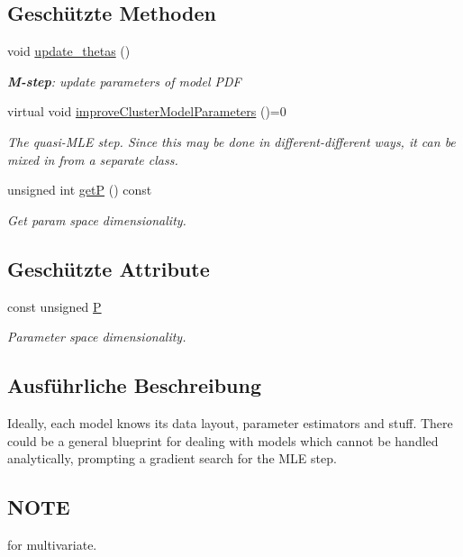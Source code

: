 \subsection*{Geschützte Methoden}
\begin{DoxyCompactItemize}
\item 
void \hyperlink{classCDA_1_1EMGenericMixtureModelCore_a12c68e86652d9a723ca0716f7676b360}{update\_\-thetas} ()
\begin{DoxyCompactList}\small\item\em {\bfseries M-\/step}: update parameters of model PDF \item\end{DoxyCompactList}\item 
virtual void \hyperlink{classCDA_1_1EMGenericMixtureModelCore_a5a7545c679b386086bf3776315e26435}{improveClusterModelParameters} ()=0
\begin{DoxyCompactList}\small\item\em The quasi-\/MLE step. Since this may be done in different-\/different ways, it can be mixed in from a separate class. \item\end{DoxyCompactList}\item 
unsigned int \hyperlink{classCDA_1_1EMGenericMixtureModelCore_a8cc9f7feff2bc07e5e493a3ef7e01ceb}{getP} () const 
\begin{DoxyCompactList}\small\item\em Get param space dimensionality. \item\end{DoxyCompactList}\end{DoxyCompactItemize}
\subsection*{Geschützte Attribute}
\begin{DoxyCompactItemize}
\item 
const unsigned \hyperlink{classCDA_1_1EMGenericMixtureModelCore_a591c27390e7a8f84249f27d88c10d2b7}{P}
\begin{DoxyCompactList}\small\item\em Parameter space dimensionality. \item\end{DoxyCompactList}\end{DoxyCompactItemize}


\subsection{Ausführliche Beschreibung}
Ideally, each model knows its data layout, parameter estimators and stuff. There could be a general blueprint for dealing with models which cannot be handled analytically, prompting a gradient search for the MLE step. \hypertarget{GaussianMixtureModel1D_8h_09_09_NOTE}{}\subsection{NOTE}\label{GaussianMixtureModel1D_8h_09_09_NOTE}
for multivariate. 

